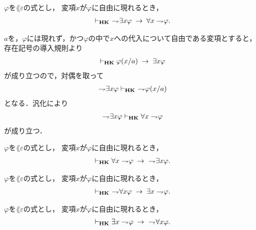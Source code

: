 	\begin{screen}
		\begin{thm}
			$\varphi$を$\lang{\varepsilon}$の式とし，
			変項$x$が$\varphi$に自由に現れるとき，
			\begin{align}
				\vdash_{{\scriptsize \mbox{{\bf HK}}}}
				\ \rightharpoondown\hspace{-0.25em} \exists x \varphi \hspace{0.25em}\rightarrow\hspace{0.25em} \forall x \rightharpoondown\hspace{-0.25em} \varphi.
			\end{align}
		\end{thm}
	\end{screen}
	
	\begin{sketch}
		$a$を，$\varphi$には現れず，かつ$\varphi$の中で$x$への代入について自由である変項とすると，
		存在記号の導入規則より
		\begin{align}
			\vdash_{{\scriptsize \mbox{{\bf HK}}}} \varphi(x/a) \hspace{0.25em}\rightarrow\hspace{0.25em} \exists x \varphi
		\end{align}
		が成り立つので，対偶を取って
		\begin{align}
			\rightharpoondown\hspace{-0.25em} \exists x \varphi \vdash_{{\scriptsize \mbox{{\bf HK}}}}
			\ \rightharpoondown\hspace{-0.25em} \varphi(x/a) 
		\end{align}
		となる．汎化により
		\begin{align}
			\rightharpoondown\hspace{-0.25em} \exists x \varphi \vdash_{{\scriptsize \mbox{{\bf HK}}}}
			\forall x \rightharpoondown\hspace{-0.25em} \varphi 
		\end{align}
		が成り立つ．
		\QED
	\end{sketch}
	
	\begin{screen}
		\begin{thm}
			$\varphi$を$\lang{\varepsilon}$の式とし，
			変項$x$が$\varphi$に自由に現れるとき，
			\begin{align}
				\vdash_{{\scriptsize \mbox{{\bf HK}}}} \forall x \rightharpoondown\hspace{-0.25em} \varphi
				\hspace{0.25em}\rightarrow\hspace{0.25em}\ \rightharpoondown\hspace{-0.25em} \exists x \varphi.
			\end{align}
		\end{thm}
	\end{screen}
	
	\begin{screen}
		\begin{thm}
			$\varphi$を$\lang{\varepsilon}$の式とし，
			変項$x$が$\varphi$に自由に現れるとき，
			\begin{align}
				\vdash_{{\scriptsize \mbox{{\bf HK}}}}\ \rightharpoondown\hspace{-0.25em} \forall x \varphi \hspace{0.25em}\rightarrow\hspace{0.25em} 
				\exists x \rightharpoondown\hspace{-0.25em} \varphi.
			\end{align}
		\end{thm}
	\end{screen}
	
	\begin{screen}
		\begin{thm}
			$\varphi$を$\lang{\varepsilon}$の式とし，
			変項$x$が$\varphi$に自由に現れるとき，
			\begin{align}
				\vdash_{{\scriptsize \mbox{{\bf HK}}}}
				\exists x \rightharpoondown\hspace{-0.25em} \varphi \hspace{0.25em}\rightarrow\hspace{0.25em}\ \rightharpoondown\hspace{-0.25em} \forall x \varphi.
			\end{align}
		\end{thm}
	\end{screen}
	
